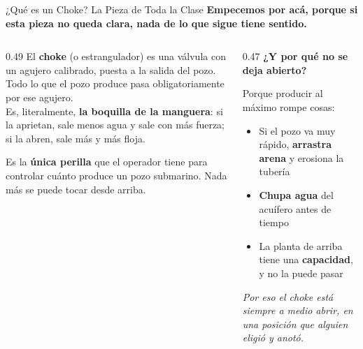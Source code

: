 \documentclass[aspectratio=169, 11pt]{beamer}
\begin{document}
\begin{frame}[shrink=16]{¿Qué es un Choke? La Pieza de Toda la Clase}
  \vspace{-4pt}
  {\small\color{arcaDark}\bfseries
   Empecemos por acá, porque si esta pieza no queda clara, nada de lo que
   sigue tiene sentido.}
  \vspace{8pt}
  \begin{columns}[T]
    \begin{column}{0.49\textwidth}
      {\footnotesize\color{textMuted}
      El \textbf{choke} (o estrangulador) es una válvula con un agujero
      calibrado, puesta a la salida del pozo. Todo lo que el pozo produce
      pasa obligatoriamente por ese agujero.\\[6pt]
      Es, literalmente, \textbf{la boquilla de la manguera}: si la aprietan,
      sale menos agua y sale con más fuerza; si la abren, sale más y más
      floja.}
      \vspace{7pt}
      \begin{tcolorbox}[colback=arcaGray, colframe=arcaDark, boxrule=0pt, leftrule=3pt,
        arc=3pt, left=6pt, right=6pt, top=4pt, bottom=4pt]
        {\scriptsize\color{textMuted}
         Es la \textbf{única perilla} que el operador tiene para controlar
         cuánto produce un pozo submarino. Nada más se puede tocar desde
         arriba.}
      \end{tcolorbox}
    \end{column}
    \begin{column}{0.47\textwidth}
      {\small\color{arcaDark}\bfseries\faQuestion\hspace{5pt}¿Y por qué no se deja abierto?}
      \vspace{4pt}
      {\footnotesize\color{textMuted}
      Porque producir al máximo rompe cosas:
      \vspace{4pt}
      \begin{itemize}\setlength{\itemsep}{4pt}
        \item[{\color{arcaRed}\scriptsize\faArrowRight}]
          Si el pozo va muy rápido, \textbf{arrastra arena} y erosiona la
          tubería
        \item[{\color{arcaRed}\scriptsize\faArrowRight}]
          \textbf{Chupa agua} del acuífero antes de tiempo
        \item[{\color{arcaRed}\scriptsize\faArrowRight}]
          La planta de arriba tiene una \textbf{capacidad}, y no la puede pasar
      \end{itemize}}
      \vspace{6pt}
      {\scriptsize\color{arcaDark}\itshape
        Por eso el choke está siempre a medio abrir, en una posición
        que alguien eligió y anotó.}
    \end{column}
  \end{columns}
\end{frame}
\end{document}
